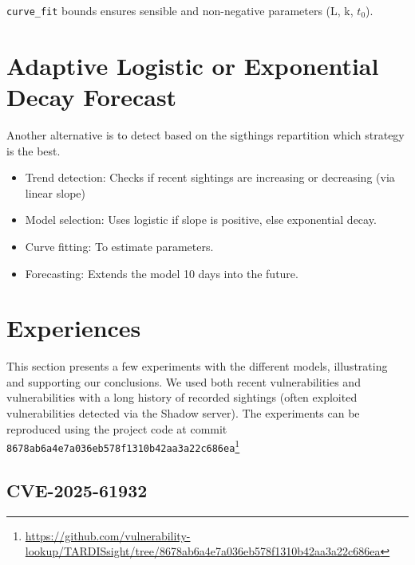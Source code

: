 \documentclass[]{article}
\begin{document}
\texttt{curve\_fit} bounds ensures sensible and non-negative parameters (L, k, $t_0$).


\section{Adaptive Logistic or Exponential Decay Forecast}

Another alternative is to detect based on the sigthings repartition which strategy is the best.

\begin{itemize}
 \item Trend detection: Checks if recent sightings are increasing or decreasing (via linear slope) %
 \item Model selection: Uses logistic if slope is positive, else exponential decay.
 \item Curve fitting: To estimate parameters.
 \item Forecasting: Extends the model 10 days into the future.
\end{itemize}


%
%


\section{Experiences}

This section presents a few experiments with the different models, illustrating and supporting our conclusions. We used both recent vulnerabilities and vulnerabilities with a long history of recorded sightings (often exploited vulnerabilities detected via the Shadow server).
The experiments can be reproduced using the project code at commit \texttt{8678ab6a4e7a036eb578f1310b42aa3a22c686ea}\footnote{\scriptsize \url{https://github.com/vulnerability-lookup/TARDISsight/tree/8678ab6a4e7a036eb578f1310b42aa3a22c686ea}}

\subsection{CVE-2025-61932}
\end{document}
